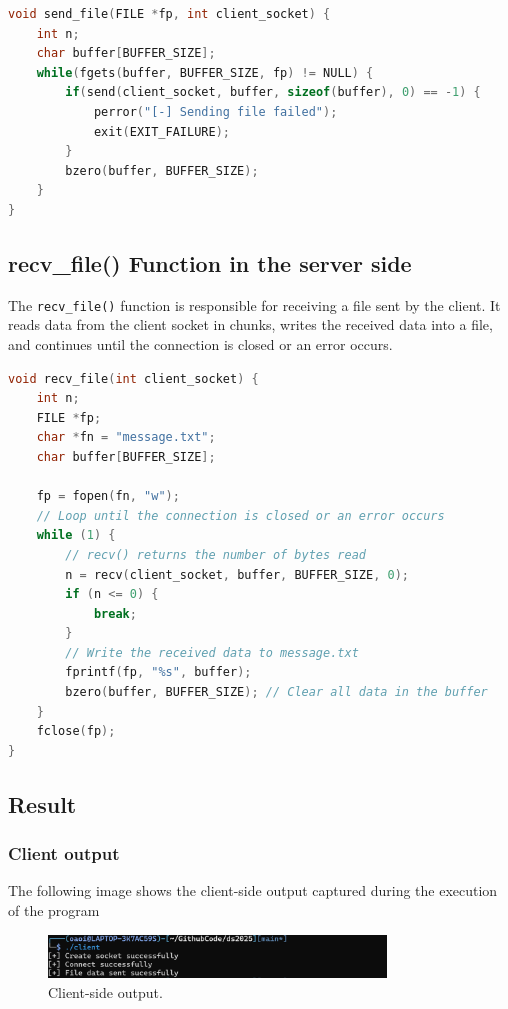 \documentclass{article}
\begin{document}
\begin{lstlisting}[language=C, caption={send\_file() Function in the Client Side}, label={lst:send_file}]
void send_file(FILE *fp, int client_socket) {
    int n;
    char buffer[BUFFER_SIZE];
    while(fgets(buffer, BUFFER_SIZE, fp) != NULL) {
        if(send(client_socket, buffer, sizeof(buffer), 0) == -1) {
            perror("[-] Sending file failed");
            exit(EXIT_FAILURE);
        }
        bzero(buffer, BUFFER_SIZE);
    }
}
\end{lstlisting}

\subsection{recv\_file() Function in the server side}

The \texttt{recv\_file()} function is responsible for receiving a file sent by the client. It reads data from the client socket in chunks, writes the received data into a file, and continues until the connection is closed or an error occurs.

\begin{lstlisting}[language=C, caption={recv\_file() Function in the Server Side}, label={lst:recv_file}]
void recv_file(int client_socket) {
    int n;
    FILE *fp;
    char *fn = "message.txt";
    char buffer[BUFFER_SIZE];

    fp = fopen(fn, "w");
    // Loop until the connection is closed or an error occurs
    while (1) {
        // recv() returns the number of bytes read
        n = recv(client_socket, buffer, BUFFER_SIZE, 0);
        if (n <= 0) {
            break;
        }
        // Write the received data to message.txt
        fprintf(fp, "%s", buffer);
        bzero(buffer, BUFFER_SIZE); // Clear all data in the buffer
    }
    fclose(fp);
}
\end{lstlisting}

\subsection{Result}

\subsubsection{Client output}
The following image shows the client-side output captured during the execution of the program
\begin{figure}[h]
    \centering
    \includegraphics[width=0.8\textwidth]{image_c.png} 
    \caption{Client-side output.}
    \label{fig:client_output}
\end{figure}
\end{document}
